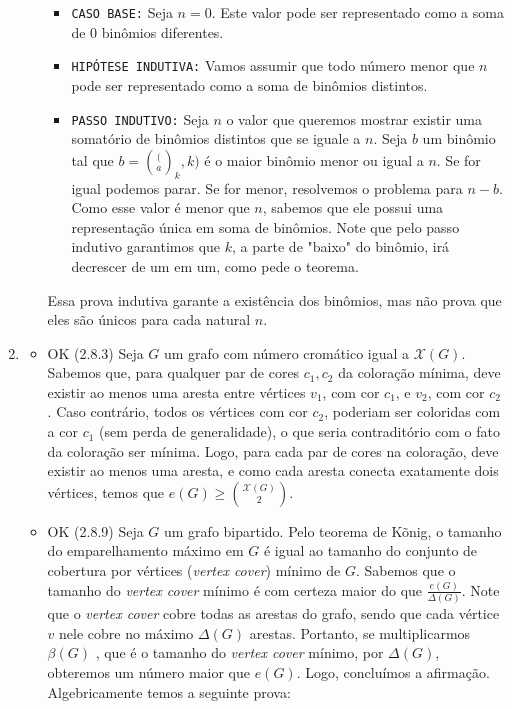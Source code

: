 \documentclass{article}
\begin{document}
\begin{enumerate}
\begin{itemize}
		            \begin{itemize}
			            \item \texttt{CASO BASE:} Seja \(n=0\). Este valor pode ser representado como a soma de \(0\) binômios diferentes.
			            \item \texttt{HIPÓTESE INDUTIVA:} Vamos assumir que todo número menor que \(n\) pode ser representado como a soma de binômios distintos.
			            \item \texttt{PASSO INDUTIVO:} Seja \(n\) o valor que queremos mostrar existir uma somatório de binômios distintos que se iguale a \(n\). Seja \(b\) um binômio tal que \(b = \binom(a_k, k)\) é o maior binômio
			                  menor ou igual a \(n\). Se for igual podemos parar. Se for menor, resolvemos o problema para \(n - b\). Como esse valor é menor que \(n\), sabemos que ele possui uma representação única em soma de binômios. Note que
			                  pelo passo indutivo garantimos que \(k\), a parte de "baixo" do binômio, irá decrescer de um em um, como pede o teorema.
		            \end{itemize}

		            Essa prova indutiva garante a existência dos binômios, mas não prova que eles são únicos para cada natural \(n\).
	      \end{itemize}
	\item \begin{itemize}
		      \item OK (2.8.3) Seja \(G\) um grafo com número cromático igual a \(\mathcal{X}(G)\). Sabemos que, para qualquer par de cores \(c_1, c_2\) da coloração mínima, deve existir ao menos uma aresta entre vértices \(v_1\), com cor \(c_1\), e \(v_2\), com cor \(c_2\). Caso contrário, todos os vértices com cor \(c_2\), poderiam ser coloridas com a cor \(c_1\) (sem perda de generalidade), o que seria contraditório com o fato da coloração ser mínima. Logo, para cada par de cores na coloração, deve existir ao menos uma aresta, e como cada aresta conecta exatamente dois vértices, temos que \(e(G) \ge \binom{\mathcal{X}(G)}{2}\).
		      \item OK (2.8.9) Seja \(G\) um grafo bipartido. Pelo teorema de Kõnig, o tamanho do emparelhamento máximo em \(G\) é
		            igual ao tamanho do conjunto de cobertura por vértices (\textit{vertex cover}) mínimo de \(G\). Sabemos que o
		            tamanho do \textit{vertex cover} mínimo é com certeza maior do que \(\frac{e(G)}{\Delta(G)}\). Note que o \textit{vertex cover} cobre todas as
		            arestas do grafo, sendo que cada vértice \(v\) nele cobre no máximo \(\Delta(G)\) arestas. Portanto, se multiplicarmos \(\beta(G)\) , que é
		            o tamanho do \textit{vertex cover} mínimo, por \(\Delta(G)\), obteremos um número maior que \(e(G)\). Logo, concluímos a afirmação.
		            Algebricamente temos a seguinte prova:


\end{itemize}
\end{enumerate}
\end{document}
